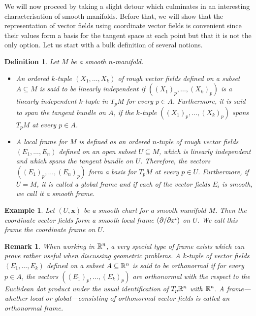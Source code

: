 \documentclass[11pt,a4paper,twoside,openany]{report}
\theoremstyle{my-theorem}
\theoremstyle{non-theorem}
\newtheorem{definition}[theorem]{Definition}
\newtheorem{remark}[theorem]{Remark}
\newtheorem{example}[theorem]{Example}
\begin{document}
		We will now proceed by taking a slight detour which culminates in an interesting characterisation of smooth manifolds. Before that, we will show that the representation of vector fields using coordinate vector fields is convenient since their values form a basis for the tangent space at each point but that it is not the only option. Let us start with a bulk definition of several notions.
		\begin{definition}
			Let $M$ be a smooth $n$-manifold.
			\begin{itemize}
				\item An ordered $k$-tuple $(X_1,\dots,X_k)$ of rough vector fields defined on a subset $A \subseteq M$ is said to be \emph{linearly independent} if $((X_1)_p,\dots,(X_k)_p)$ is a linearly independent $k$-tuple in $T_p M$ for every $p \in A$. Furthermore, it is said to \emph{span the tangent bundle} on $A$, if the $k$-tuple $((X_1)_p,\dots,(X_k)_p)$ spans $T_pM$ at every $p \in A$.
					
				\item A \emph{local frame for $M$} is defined as an ordered $n$-tuple of rough vector fields $(E_1,\dots,E_n)$ defined on an open subset $U \subseteq M$, which is linearly independent and which spans the tangent bundle on $U$. Therefore, the vectors $((E_1)_p, \dots, (E_n)_p)$ form a basis for $T_p M$ at every $p \in U$. Furthermore, if $U = M$, it is called a \emph{global frame} and if each of the vector fields $E_i$ is smooth, we call it a \emph{smooth frame}.
			\end{itemize}
		\end{definition}
		
		\begin{example}
			Let $(U,\mathbf x)$ be a smooth chart for a smooth manifold $M$. Then the coordinate vector fields form a smooth local frame $(\partial/\partial x^i)$ on $U$. We call this frame the \emph{coordinate frame} on $U$.
		\end{example}
		
		\begin{remark}
			When working in ${\mathbb R}^n$, a very special type of frame exists which can prove rather useful when discussing geometric problems. A $k$-tuple of vector fields $(E_1,\dots,E_k)$ defined on a subset $A \subseteq {\mathbb R}^n$ is said to be \emph{orthonormal} if for every $p \in A$, the vectors $((E_1)_p,\dots,(E_k)_p)$ are orthonormal with the respect to the Euclidean dot product under the usual identification of $T_p {\mathbb R}^n$ with ${\mathbb R}^n$. A frame---whether local or global---consisting of orthonormal vector fields is called an \emph{orthonormal frame}.
		\end{remark}
		
\end{document}
